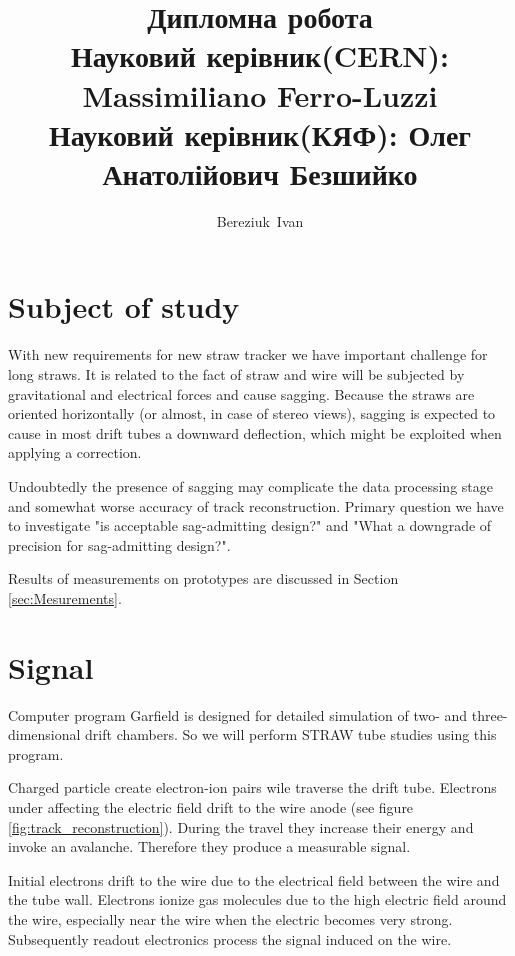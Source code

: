 \documentclass[12pt,a4paper]{article}
\author{Bereziuk~Ivan}
\title{ Дипломна робота \\
		Науковий керівник(CERN): Massimiliano Ferro-Luzzi\\
		Науковий керівник(КЯФ): Олег Анатолійович Безшийко \\
		}
\begin{document}
	 \linenumbers
	\maketitle
	\newpage
	
		
	\begin{spacing}{1}
	 
	\end{spacing}	

 \section{Subject of study}
	
	With new requirements for new straw tracker we have important challenge for long straws. It is related to the fact of straw and wire will be subjected by gravitational and electrical forces and cause sagging. Because the straws are oriented horizontally (or almost, in case of stereo views), sagging is expected to cause in most drift tubes a downward deflection, which might be exploited
when applying a correction.

	Undoubtedly the presence of sagging may complicate the data processing stage and somewhat worse accuracy of track reconstruction. Primary question we have to investigate "is acceptable sag-admitting design?" and "What a downgrade of precision for sag-admitting design?".
	
	Results of measurements on prototypes are discussed in Section \ref{sec:Mesurements}.
	
	
	\section{Signal}	
	Computer program Garfield \cite{garfield} is designed for detailed simulation of two- and three-dimensional drift chambers. So we will perform STRAW tube studies using this program.
	
	Charged particle  create electron-ion pairs wile traverse the drift tube. Electrons under affecting the electric field drift to the wire anode (see figure \ref{fig:track_reconstruction}). During the travel they increase their energy and invoke an avalanche. Therefore they produce a measurable signal.

	Initial electrons drift to the wire due to the electrical field between the wire and the tube wall. Electrons ionize gas molecules due to the high electric field around the wire, especially near the wire when the electric becomes very strong.  Subsequently readout electronics process the signal induced on the wire.
	  
\end{document}
